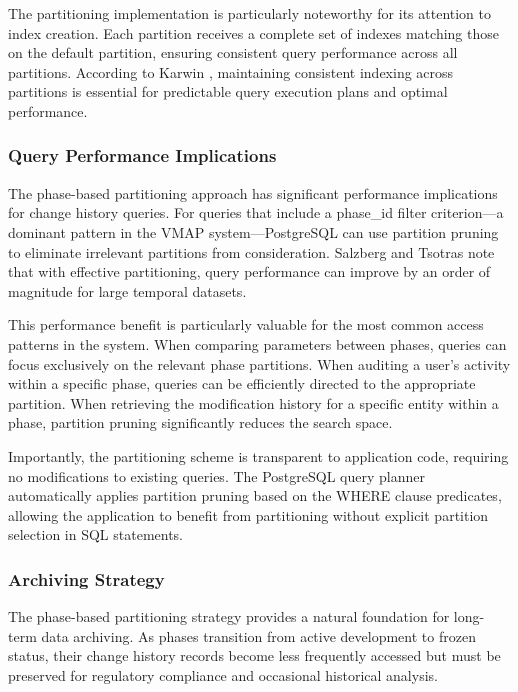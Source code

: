 The partitioning implementation is particularly noteworthy for its attention to index creation. Each partition receives a complete set of indexes matching those on the default partition, ensuring consistent query performance across all partitions. According to Karwin \cite{karwin2010sql}, maintaining consistent indexing across partitions is essential for predictable query execution plans and optimal performance.

\subsubsection{Query Performance Implications}
\label{subsubsec:query-performance-implications}

The phase-based partitioning approach has significant performance implications for change history queries. For queries that include a phase\_id filter criterion—a dominant pattern in the \ac{VMAP} system—PostgreSQL can use partition pruning to eliminate irrelevant partitions from consideration. Salzberg and Tsotras \cite{salzberg1999comparison} note that with effective partitioning, query performance can improve by an order of magnitude for large temporal datasets.

This performance benefit is particularly valuable for the most common access patterns in the system. When comparing parameters between phases, queries can focus exclusively on the relevant phase partitions. When auditing a user's activity within a specific phase, queries can be efficiently directed to the appropriate partition. When retrieving the modification history for a specific entity within a phase, partition pruning significantly reduces the search space.

Importantly, the partitioning scheme is transparent to application code, requiring no modifications to existing queries. The PostgreSQL query planner automatically applies partition pruning based on the WHERE clause predicates, allowing the application to benefit from partitioning without explicit partition selection in SQL statements.

\subsubsection{Archiving Strategy}
\label{subsubsec:archiving-strategy}

The phase-based partitioning strategy provides a natural foundation for long-term data archiving. As phases transition from active development to frozen status, their change history records become less frequently accessed but must be preserved for regulatory compliance and occasional historical analysis.

